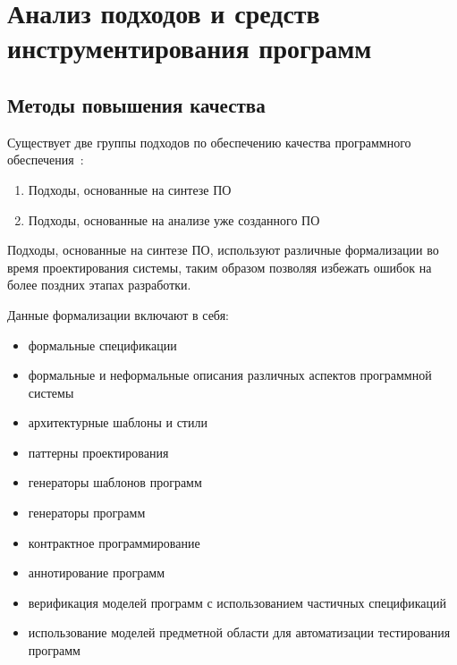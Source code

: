 \chapter{Анализ подходов и средств инструментирования программ}
\section{Методы повышения качества}
\label{sec:quality_methods}

Существует две группы подходов по обеспечению качества программного
обеспечения~\cite{itsykson}:

\begin{enumerate}
    \item Подходы, основанные на синтезе ПО
    \item Подходы, основанные на анализе уже созданного ПО
\end{enumerate}

Подходы, основанные на синтезе ПО, используют различные формализации во время
проектирования системы, таким образом позволяя избежать ошибок на более поздних
этапах разработки.

Данные формализации включают в себя:

\begin{itemize}
    \item формальные спецификации
    \item формальные и неформальные описания различных аспектов программной
    системы
    \item архитектурные шаблоны и стили
    \item паттерны проектирования
    \item генераторы шаблонов программ
    \item генераторы программ
    \item контрактное программирование
    \item аннотирование программ
    \item верификация моделей программ с использованием частичных спецификаций
    \item использование моделей предметной области для автоматизации
    тестирования программ
\end{itemize}

